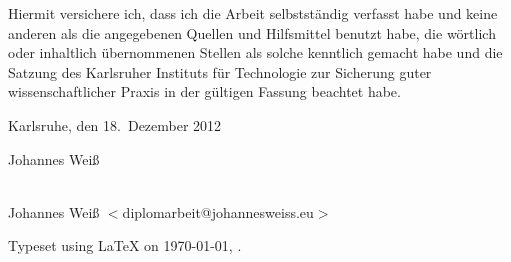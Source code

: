 \cleardoublepage{}

\thispagestyle{empty}

\vspace*{\fill}


\bigskip{}

\noindent{}Hiermit versichere ich, dass ich die Arbeit selbstst\"andig verfasst
habe und keine anderen als die angegebenen Quellen und Hilfsmittel benutzt habe,
die w\"ortlich oder inhaltlich \"ubernommenen Stellen als solche kenntlich
gemacht habe und die Satzung des Karlsruher Instituts f\"ur Technologie zur
Sicherung guter wissenschaftlicher Praxis in der g\"ultigen Fassung beachtet
habe.

\bigskip{}

Karlsruhe, den 18.\ Dezember 2012

\bigskip{}

\bigskip{}

\bigskip{}

Johannes Wei\ss

\vspace*{\fill}

\cleardoublepage

\thispagestyle{empty}

\vspace*{\fill}
\begin{center}
{\Large \JWtitle{}} \\
Johannes Wei\ss{} $<$diplomarbeit@johannesweiss.eu$>$
\end{center}
\vspace*{\fill}

\newpage
\thispagestyle{empty}

\null
\vfill
\hfill Typeset using \LaTeX{} on \today{}, \currenttime{}.


